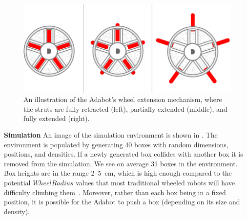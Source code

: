 \begin{figure}[!ht]
    \centering

    \includegraphics[width=\columnwidth]{figures/3-adabot/extension-mechanism.png}

    \vspace{-0.08in}

    \caption{An illustration of the Adabot's wheel extension mechanism, where the struts are fully retracted (left), partially extended (middle), and fully extended (right).}
    \label{fig:wheel-extender}

    \vspace{-0.15in}

\end{figure}

\vspace{0.1in}
\noindent
\textbf{Simulation}
%
%
An image of the simulation environment is shown in .
%
The environment is populated by generating 40 boxes with random dimensions, positions, and densities.
%
If a newly generated box collides with another box it is removed from the simulation. We see on average 31 boxes in the environment.
%
Box heights are in the range \numrange{2}{5}~\si{cm}, which is high enough compared to the potential $\mathit{WheelRadius}$ values that most traditional wheeled robots will have difficulty climbing them~\autocite{Quinn.IROS.Whegs.2002}.
%
Moreover, rather than each box being in a fixed position, it is possible for the Adabot to push a box (depending on its size and density).


